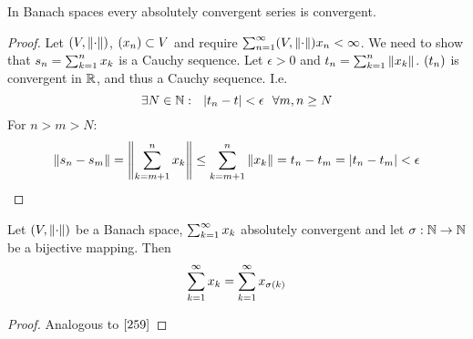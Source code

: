 \documentclass[../../script.tex]{subfiles}
\begin{document}
\begin{thm}
    In Banach spaces every absolutely convergent series is convergent.
\end{thm}
\begin{proof}
    Let $\normed$, $\anyseqdef{V}$ and require $\series{n} \normed{x_n} < \infty$. We need to show that $s_n = \series[n]{k} x_k$ is a Cauchy sequence.
    Let $\epsilon > 0$ and $t_n = \series[n]{k} \norm{x_k}$. $\seq{t}$ is convergent in $\realn$, and thus a Cauchy sequence.
    I.e. 
    \begin{equation}
        \exists N \in \natn: ~~|t_n - t| < \epsilon ~~\forall m, n \ge N
    \end{equation}
    For $n > m > N$:
    \begin{equation}
        \norm{s_n - s_m} = \norm{\sum_{k=m+1}^n x_k} \le \sum_{k=m+1}^n \norm{x_k} = t_n - t_m = |t_n - t_m| < \epsilon
    \end{equation}
\end{proof}

\begin{thm}
    Let $\normed$ be a Banach space, $\series{k} x_k$ absolutely convergent and let $\sigma: \natn \rightarrow \natn$ be a bijective mapping. Then 
    \[
        \series{k} x_k = \series{k} x_{\sigma(k)}
    \]
\end{thm}
\begin{proof}
    Analogous to $\Cref{259}$
\end{proof}
\end{document}

